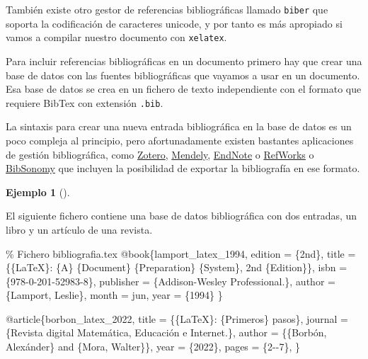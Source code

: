 \documentclass[
  spanish,
  a4paper,
]{scrreport}
\newenvironment{Shaded}{\begin{snugshade}}{\end{snugshade}}
\newcommand{\CommentTok}[1]{\textcolor[rgb]{0.37,0.37,0.37}{#1}}
\newcommand{\NormalTok}[1]{\textcolor[rgb]{0.00,0.23,0.31}{#1}}
\theoremstyle{definition}
\newtheorem{example}{Ejemplo}[chapter]
\theoremstyle{remark}
\begin{document}
También existe otro gestor de referencias bibliográficas llamado
\texttt{biber} que soporta la codificación de caracteres unicode, y por
tanto es más apropiado si vamos a compilar nuestro documento con
\texttt{xelatex}.

Para incluir referencias bibliográficas en un documento primero hay que
crear una base de datos con las fuentes bibliográficas que vayamos a
usar en un documento. Esa base de datos se crea en un fichero de texto
independiente con el formato que requiere BibTex con extensión
\texttt{.bib}.

La sintaxis para crear una nueva entrada bibliográfica en la base de
datos es un poco compleja al principio, pero afortunadamente existen
bastantes aplicaciones de gestión bibliográfica, como
\href{https://www.zotero.org/}{Zotero},
\href{https://www.mendeley.com/}{Mendely},
\href{https://endnote.com/}{EndNote} o
\href{https://refworks.proquest.com/researcher/}{RefWorks} o
\href{https://www.bibsonomy.org/}{BibSonomy} que incluyen la posibilidad
de exportar la bibliografía en ese formato.

\begin{example}[]\protect\hypertarget{exm-bibliografia}{}\label{exm-bibliografia}

El siguiente fichero contiene una base de datos bibliográfica con dos
entradas, un libro y un artículo de una revista.

\begin{Shaded}
\begin{Highlighting}[]
\CommentTok{\% Fichero bibliografia.tex}
\NormalTok{@book\{lamport\_latex\_1994,}
\NormalTok{    edition = \{2nd\},}
\NormalTok{    title = \{\{LaTeX\}: \{A\} \{Document\} \{Preparation\} \{System\}, 2nd \{Edition\}\},}
\NormalTok{    isbn = \{978{-}0{-}201{-}52983{-}8\},}
\NormalTok{    publisher = \{Addison{-}Wesley Professional.\},}
\NormalTok{    author = \{Lamport, Leslie\},}
\NormalTok{    month = jun,}
\NormalTok{    year = \{1994\}}
\NormalTok{\}}

\NormalTok{@article\{borbon\_latex\_2022,}
\NormalTok{    title = \{\{LaTeX\}: \{Primeros\} pasos\},}
\NormalTok{    journal = \{Revista digital Matemática, Educación e Internet.\},}
\NormalTok{    author = \{\{Borbón, Alexánder\} and \{Mora, Walter\}\},}
\NormalTok{    year = \{2022\},}
\NormalTok{    pages = \{2{-}{-}7\},}
\NormalTok{\}}
\end{Highlighting}
\end{Shaded}

\end{example}
\end{document}
